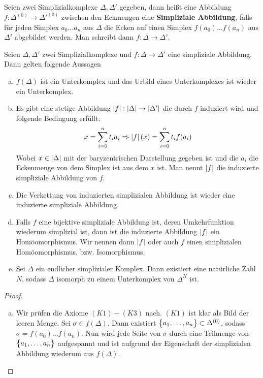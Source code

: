 
\begin{Def} 
  Seien zwei Simplizialkomplexe $\Delta, \Delta'$ gegeben, dann heißt
  eine Abbildung $f: \Delta^{(0)} \rightarrow \Delta'^{(0)}$ zwischen
  den Eckmengen eine \textbf{Simpliziale Abbildung}, falls für jeden
  Simplex $a_0 \ldots a_n$ aus $\Delta$ die Ecken auf einen Simplex
  $f(a_0) \ldots f(a_n)$ aus $\Delta'$ abgebildet werden. Man schreibt
  dann $f: \Delta \rightarrow \Delta'$.
\end{Def}

\begin{Satz} \label{satz:geosimp} Seien $\Delta, \Delta'$ zwei
  Simplizialkomplexe und $f: \Delta \rightarrow \Delta'$ eine
  simpliziale Abbildung. Dann gelten folgende Aussagen
	\begin{enumerate}[(a)]
        \item $f(\Delta)$ ist ein Unterkomplex und das Urbild eines
          Unterkomplexes ist wieder ein Unterkomplex.
        \item Es gibt eine stetige Abbildung
          $\left| f \right| : \left| \Delta \right| \rightarrow \left| \Delta' \right|$ die durch
          $f$ induziert wird und folgende Bedingung erfüllt:
          \begin{gather*}
            x = \sum\limits_{i=0}^{n} t_i a_i \Rightarrow \left| f \right|(x) = \sum\limits_{i=0}^{n}
            t_i f(a_i)
          \end{gather*}
          Wobei $x \in \left| \Delta \right|$ mit der baryzentrischen
          Darstellung gegeben ist und die $a_i$ die Eckenmenge von dem
          Simplex ist aus dem $x$ ist.  Man nennt $\left| f \right|$ die
          induzierte simpliziale Abbildung von $f$.
        \item Die Verkettung von induzierten simplizialen Abbildung
          ist wieder eine induzierte simpliziale Abbildung.
        \item Falls $f$ eine bijektive simpliziale Abbildung ist,
          deren Umkehrfunktion wiederum simplizial ist, dann ist die
          induzierte Abbildung $\left| f \right|$ ein Homöomorphismus. Wir
          nennen dann $\left| f \right|$ oder auch $f$ einen simplizialen
          Homöomorphismus, bzw. Isomorphismus.
        \item Sei $\Delta$ ein endlicher simplizialer Komplex. Dann
          existiert eine natürliche Zahl $N$, sodass $\Delta$
          isomorph zu einem Unterkomplex von $\Delta^N$ ist.
	\end{enumerate}
	\begin{proof}
          \begin{enumerate}[(a)]
          \item Wir prüfen die Axiome $(K1)-(K3)$ nach. $(K1)$ ist
            klar als Bild der leeren Menge. Sei
            $\sigma \in f(\Delta)$. Dann existiert
            $\bigl\{ a_1 , \ldots , a_n \bigr\} \subset \Delta^{(0)}$, sodass
            $\sigma = f(a_0)\ldots f(a_n)$. Nun wird jede Seite von
            $\sigma$ durch eine Teilmenge von
            $\bigl\{ a_1 ,\ldots , a_n \bigr\}$ aufgespannt und ist aufgrund
            der Eigenschaft der simplizialen Abbildung wiederum aus
            $f(\Delta)$.


\end{enumerate}
\end{proof}
\end{Satz}
